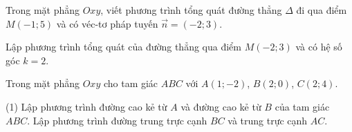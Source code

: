 \begin{vd}
	Trong mặt phẳng $Oxy$, viết phương trình tổng quát đường thẳng $\Delta$ đi qua điểm $M(-1;5)$ và có véc-tơ pháp tuyến $ \overrightarrow{n} = \left(-2;3 \right)$.
\end{vd}

\begin{vd}
	Lập phương trình tổng quát của đường thẳng qua điểm $M(-2;3)$ và có hệ số góc $k=2$.
\end{vd}
\begin{vd}
	Trong mặt phẳng $Oxy$ cho tam giác $ABC$ với $A(1;-2)$, $B(2;0)$, $C(2;4)$. 
	\begin{tasks}(1)
		\task Lập phương trình đường cao kẻ từ $A$ và đường cao kẻ từ $B$ của tam giác $ABC$.
		\task Lập phương trình đường trung trực cạnh $BC$ và trung trực cạnh $AC$.
	\end{tasks}
\loigiai{
}
\end{vd}

